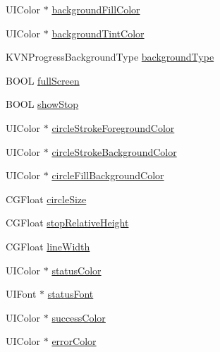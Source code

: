\begin{DoxyCompactItemize}
\item 
U\+I\+Color $\ast$ \mbox{\hyperlink{interface_k_v_n_progress_configuration_aa2cbc8cdea47166053ff58f35ca0c6ed}{background\+Fill\+Color}}
\item 
U\+I\+Color $\ast$ \mbox{\hyperlink{interface_k_v_n_progress_configuration_a25c413662417daf47f31eb93e7169ce4}{background\+Tint\+Color}}
\item 
K\+V\+N\+Progress\+Background\+Type \mbox{\hyperlink{interface_k_v_n_progress_configuration_a888a12a77fef600633853d711ff3a2e3}{background\+Type}}
\item 
B\+O\+OL \mbox{\hyperlink{interface_k_v_n_progress_configuration_a518994086f5c7064ad5efb0ba0d4e071}{full\+Screen}}
\item 
B\+O\+OL \mbox{\hyperlink{interface_k_v_n_progress_configuration_a892e5c6bd4509f54a5f3c93ed1149a93}{show\+Stop}}
\item 
U\+I\+Color $\ast$ \mbox{\hyperlink{interface_k_v_n_progress_configuration_a22e2765fea808f1c354284f12f59f2a2}{circle\+Stroke\+Foreground\+Color}}
\item 
U\+I\+Color $\ast$ \mbox{\hyperlink{interface_k_v_n_progress_configuration_a0cdc7ea216e8ae6f514adae36909103d}{circle\+Stroke\+Background\+Color}}
\item 
U\+I\+Color $\ast$ \mbox{\hyperlink{interface_k_v_n_progress_configuration_a6e2708ea1894f1080be525b9fe26fcf1}{circle\+Fill\+Background\+Color}}
\item 
C\+G\+Float \mbox{\hyperlink{interface_k_v_n_progress_configuration_a9e91ce2bb915fbd65e5263688184a08a}{circle\+Size}}
\item 
C\+G\+Float \mbox{\hyperlink{interface_k_v_n_progress_configuration_a13c28cb1c97c828910a6f8545e2fba5f}{stop\+Relative\+Height}}
\item 
C\+G\+Float \mbox{\hyperlink{interface_k_v_n_progress_configuration_a77da7145687142f6d8acd3519c0bfcd7}{line\+Width}}
\item 
U\+I\+Color $\ast$ \mbox{\hyperlink{interface_k_v_n_progress_configuration_a0c9da93f704023bb717b765f64fe0202}{status\+Color}}
\item 
U\+I\+Font $\ast$ \mbox{\hyperlink{interface_k_v_n_progress_configuration_a51b53b3831455ff98054457406c7c8d8}{status\+Font}}
\item 
U\+I\+Color $\ast$ \mbox{\hyperlink{interface_k_v_n_progress_configuration_a3451b3dcc0d6f38d2bbd988931f8c11d}{success\+Color}}
\item 
U\+I\+Color $\ast$ \mbox{\hyperlink{interface_k_v_n_progress_configuration_aaf4eb609d7e22fb872073e66abf40991}{error\+Color}}

\end{DoxyCompactItemize}
